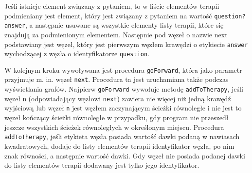 Jeśli istnieje element związany z pytaniem, to w liście elementów terapii podmieniany jest element, który jest związany z pytaniem na wartość \texttt{question?answer}, a następnie usuwane są wszystkie elementy listy terapii, które się znajdują za podmienionym elementem. 
Następnie pod węzeł o nazwie next podstawiany jest węzeł, który jest pierwszym węzłem krawędzi o etykiecie \texttt{answer} wychodzącej z węzła o identyfikatorze \texttt{question}. 

W kolejnym kroku wywoływana jest procedura \texttt{goForward}, która jako parametr przyjmuje m. in. węzeł \texttt{next}. 
Procedura ta jest uruchamiana także podczas wyświetlania grafów. Najpierw 
\texttt{goForward} wywołuje metodę \texttt{addToTherapy}, 
jeśli węzeł \texttt{n} (odpowiadający węzłowi \texttt{next}) zawiera nie więcej niż jedną krawędź wyjściową lub węzeł \texttt{n} jest węzłem zaczynającym ścieżki równoległe 
i nie jest to węzeł kończący ścieżki równoległe w przypadku, gdy program nie przeszedł jeszcze wszystkich ścieżek równoległych w określonym miejscu. 
Procedura \texttt{addToTherapy}, jeśli etykieta węzła posiada wartość dawki podaną w nawiasach kwadratowych, dodaje do listy elementów terapii identyfikator węzła, po nim znak równości, a następnie wartość dawki. Gdy węzeł nie posiada podanej dawki do listy elementów terapii dodawany jest tylko jego identyfikator. 

